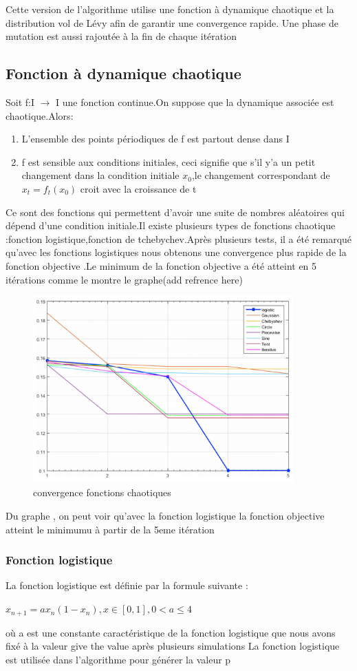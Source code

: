 \documentclass[12pt]{article}
\begin{document}
    Cette version de l'algorithme utilise une fonction à dynamique chaotique et la distribution vol de Lévy afin de garantir une convergence rapide. Une phase de mutation est aussi rajoutée à la fin de chaque itération
\subsection{Fonction à dynamique chaotique}
Soit f:I $\rightarrow$ I une fonction continue.On suppose que la dynamique associée est chaotique.Alors:
\begin{enumerate}
    \item L'ensemble des points périodiques de f est partout dense dans I 
    \item f est sensible aux conditions initiales, ceci signifie que s'il y'a un petit changement dans la condition initiale $x_0$,le changement correspondant de $x_t=f_t(x_0)$ croit avec la croissance de t 
\end{enumerate}
Ce sont des fonctions qui permettent d'avoir une suite de nombres aléatoires qui dépend d'une condition initiale.Il existe plusieurs types de fonctions chaotique :fonction logistique,fonction de tchebychev.Après plusieurs tests, il a été remarqué qu'avec les fonctions logistiques nous obtenons une convergence plus rapide de la fonction objective .Le minimum de la fonction objective a été atteint en 5 itérations comme le montre le graphe(add refrence here)
\begin{figure}[h!]
   \centering
    \includegraphics[width=10cm]{../figures/logisticvsothers.PNG}
    \caption[\small]{convergence fonctions chaotiques}
\end{figure}
Du graphe , on peut voir qu'avec la fonction logistique la fonction objective atteint le minimumu à partir de la 5eme itération
\subsubsection{Fonction logistique}
La fonction logistique est définie par la formule suivante :
\newline
\begin{center}
    $x_{n+1}=ax_n(1-x_n) ,x\in[0,1],0<a\leq4$   
\end{center}
où a est une constante caractéristique de la fonction logistique que nous avons fixé à la valeur give the value après plusieurs simulations
La fonction logistique est utilisée dans l'algorithme pour générer la valeur p
\end{document}
